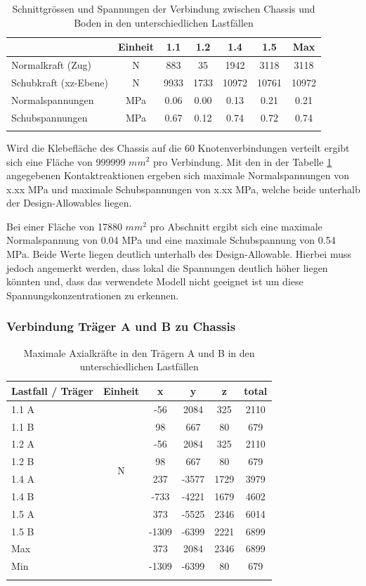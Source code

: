\begin{table}[H]
\centering
\begin{tabular}{lcccccc}
\thickhline
&	Einheit	&	1.1	&	1.2	&	1.4	&	1.5	&	Max	\\	\hline
Normalkraft (Zug)	&	N	&	883	&	35	&	1942	&	3118	&	3118	\\
Schubkraft (xz-Ebene)	&	N	&	9933	&	1733	&	10972	&	10761	&	10972	\\	\hline
Normalspannungen	&	MPa	&	0.06	&	0.00	&	0.13	&	0.21	&	0.21	\\
Schubspannungen	&	MPa	&	0.67	&	0.12	&	0.74	&	0.72	&	0.74	\\	\thickhline
\end{tabular}
\caption{Schnittgrössen und Spannungen der Verbindung zwischen Chassis und Boden in den unterschiedlichen Lastfällen}
\label{tab:FEMres Boden}
\end{table}

Wird die Klebefläche des Chassis auf die 60 Knotenverbindungen verteilt ergibt sich eine Fläche von 999999 $mm^2$ pro Verbindung. Mit den in der Tabelle \ref{tab:FEMres Boden} angegebenen Kontaktreaktionen ergeben sich maximale Normalspannungen von x.xx MPa und maximale Schubspannungen von x.xx MPa, welche beide unterhalb der Design-Allowables liegen. 

Bei einer Fläche von 17880 $mm^2$ pro Abschnitt ergibt sich eine maximale Normalspannung von 0.04 MPa und eine maximale Schubspannung von 0.54 MPa. Beide Werte liegen deutlich unterhalb des Design-Allowable. Hierbei muss jedoch angemerkt werden, dass lokal die Spannungen deutlich höher liegen könnten und, dass das verwendete Modell nicht geeignet ist um diese Spannungskonzentrationen zu erkennen.

\subsubsection{Verbindung Träger A und B zu Chassis}
\begin{table}[H]
\centering
\begin{tabular}{lccccc}
\thickhline
Lastfall / Träger	&	Einheit	&	x	&	y	&	z	&	total	\\	\hline
1.1 A	&	\multirow{8}{*}{N}	&	-56	&	2084	&	325	&	2110	\\
1.1 B	&		&	98	&	667	&	80	&	679	\\
1.2 A	&		&	-56	&	2084	&	325	&	2110	\\
1.2 B	&		&	98	&	667	&	80	&	679	\\
1.4 A	&		&	237	&	-3577	&	1729	&	3979	\\
1.4 B	&		&	-733	&	-4221	&	1679	&	4602	\\
1.5 A	&		&	373	&	-5525	&	2346	&	6014	\\
1.5 B	&		&	-1309	&	-6399	&	2221	&	6899	\\	\hline
Max	&		&	373	&	2084	&	2346	&	6899	\\
Min	&		&	-1309	&	-6399	&	80	&	679	\\	\thickhline
\end{tabular}
\caption{Maximale Axialkräfte in den Trägern A und B in den unterschiedlichen Lastfällen}
\label{tab:FEMres Träger Axial}
\end{table}


